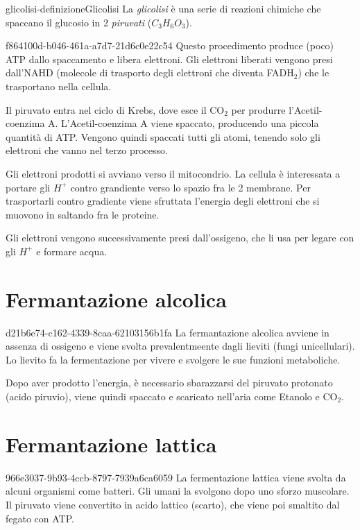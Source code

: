 \documentclass[preview]{standalone}
\begin{document}
\begin{snippetdefinition}{glicolisi-definizione}{Glicolisi}
    La \textit{glicolisi} è una serie di reazioni chimiche che spaccano il glucosio in 2 \textit{piruvati} (\(C_3H_6O_3\)).
\end{snippetdefinition}

\begin{snippet}{f864100d-b046-461a-a7d7-21d6c0e22c54}
    Questo procedimento produce (poco) ATP dallo spaccamento e libera elettroni.
    Gli elettroni liberati vengono presi dall'NAHD (molecole di trasporto degli elettroni
    che diventa FADH\({}_2\))
    che le trasportano nella cellula.

    Il piruvato entra nel ciclo di Krebs, dove esce il CO\({}_2\) per produrre l'Acetil-coenzima A.
    L'Acetil-coenzima A viene spaccato, producendo una piccola quantità di ATP.
    Vengono quindi spaccati tutti gli atomi, tenendo solo gli elettroni che vanno nel terzo processo.

    Gli elettroni prodotti si avviano verso il mitocondrio. La cellula è interessata a portare
    gli \(H^+\) contro grandiente verso lo spazio fra le 2 membrane.
    Per trasportarli contro gradiente viene sfruttata l'energia degli elettroni che si muovono in saltando fra le proteine.

    Gli elettroni vengono successivamente presi dall'ossigeno, che li usa per legare con gli \(H^+\) e formare
    acqua.
\end{snippet}

\section{Fermantazione alcolica}

\begin{snippet}{d21b6e74-c162-4339-8caa-62103156b1fa}
    La fermantazione alcolica avviene in assenza di ossigeno e viene svolta prevalentmeente dagli lieviti (fungi unicellulari).
    Lo lievito fa la fermentazione per vivere e svolgere le sue funzioni metaboliche.
    
    Dopo aver prodotto l'energia, è necessario sbarazzarsi del piruvato protonato (acido piruvio),
    viene quindi spaccato e scaricato nell'aria come Etanolo e CO\({}_2\).
\end{snippet}

\section{Fermantazione lattica}

\begin{snippet}{966e3037-9b93-4ccb-8797-7939a6ca6059}
    La fermentazione lattica viene svolta da alcuni organismi come batteri.
    Gli umani la svolgono dopo uno sforzo muscolare.
    Il piruvato viene convertito in acido lattico (scarto), che viene poi smaltito dal fegato con ATP.
\end{snippet}
\end{document}
